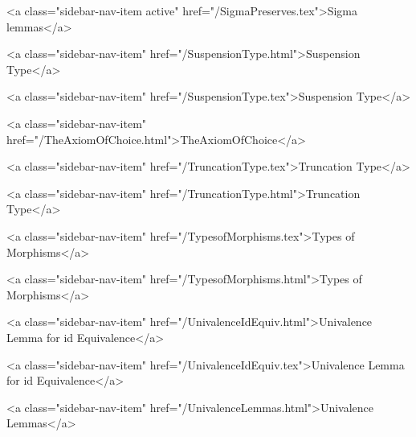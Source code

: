       
    
      
        
          <a class="sidebar-nav-item active" href="/SigmaPreserves.tex">Sigma lemmas</a>
        
      
    
      
        
          <a class="sidebar-nav-item" href="/SuspensionType.html">Suspension Type</a>
        
      
    
      
        
          <a class="sidebar-nav-item" href="/SuspensionType.tex">Suspension Type</a>
        
      
    
      
        
          <a class="sidebar-nav-item" href="/TheAxiomOfChoice.html">TheAxiomOfChoice</a>
        
      
    
      
        
          <a class="sidebar-nav-item" href="/TruncationType.tex">Truncation Type</a>
        
      
    
      
        
          <a class="sidebar-nav-item" href="/TruncationType.html">Truncation Type</a>
        
      
    
      
        
          <a class="sidebar-nav-item" href="/TypesofMorphisms.tex">Types of Morphisms</a>
        
      
    
      
        
          <a class="sidebar-nav-item" href="/TypesofMorphisms.html">Types of Morphisms</a>
        
      
    
      
        
          <a class="sidebar-nav-item" href="/UnivalenceIdEquiv.html">Univalence Lemma for id Equivalence</a>
        
      
    
      
        
          <a class="sidebar-nav-item" href="/UnivalenceIdEquiv.tex">Univalence Lemma for id Equivalence</a>
        
      
    
      
        
          <a class="sidebar-nav-item" href="/UnivalenceLemmas.html">Univalence Lemmas</a>
        
